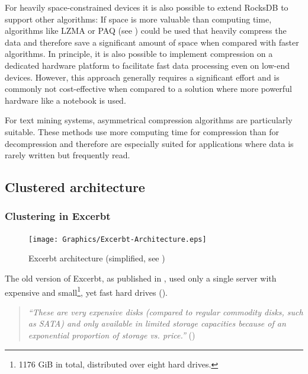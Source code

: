 \documentclass[a4paper, 12pt, twoside, reqn]{report}
\numberwithin{figure}{chapter}
\newtheorem[L]{boxedDefinition}{Definition}
\newtheorem[L]{boxedExample}{Example}
\newcommand{\itquote}[1]{\textit{{``}#1{''}}}
\begin{document}
For heavily space-constrained devices it is also possible to extend RocksDB to support other algorithms: If space is more valuable than computing time, algorithms like LZMA or PAQ (see \cite{mahoneypaq}) could be used that heavily compress the data and therefore save a significant amount of space when compared with faster algorithms. In principle, it is also possible to implement compression on a dedicated hardware platform to facilitate fast data processing even on low-end devices. However, this approach generally requires a significant effort and is commonly not cost-effective when compared to a solution where more powerful hardware like a notebook is used.

For text mining systems, asymmetrical compression algorithms are particularly suitable. These methods use more computing time for compression than for decompression and therefore are especially suited for applications where data is rarely written but frequently read.


\subsection{Clustered architecture}\label{ssec:clustering}

\subsubsection{Clustering in Excerbt}\label{sssec:clustering-excerbt}

\begin{figure}[!htb]
  \centering
  \texttt{[image: Graphics/Excerbt-Architecture.eps]}
  \caption[Excerbt architecture]{Excerbt architecture (simplified, see \cite[section 4.2]{wachinger2013next})}
  \label{fig:excerbt-architecture}
\end{figure}

The old version of Excerbt, as published in \cite{barnickel2009large}, used only a single server with expensive and small\footnote{1176 GiB in total, distributed over eight hard drives.}, yet fast hard drives (\cite[section 4.2.1]{wachinger2013next}).

\begin{quote}
  \itquote{These are very expensive disks (compared to regular commodity disks, such as SATA) and only available in limited storage capacities because of an exponential proportion of storage vs. price.} (\cite[section 4.1]{wachinger2013next})
\end{quote}
\end{document}
